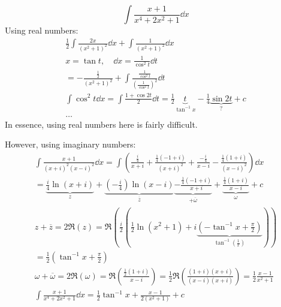 \documentclass[00_complete]{subfiles}
\begin{document}
\begin{example}
    $$\int \frac{x+1}{x^4+2x^2+1}\dd{x}$$
    Using real numbers:
    $$
    \begin{gathered}
        \frac{1}{2} \int \frac{2x}{(x^2+1)^2}\dd{x}+\int
        \frac{1}{(x^2+1)^2}\dd{x} \\
        x=\tan t, \quad \dd{x} = \frac{1}{\cos^2t}\dd{t} \\
        =-\frac{\frac{1}{2}}{(x^2+1)^2}+\int
        \frac{\frac{1}{\cos^2t}}{\left(\frac{1}{\cos^2t}\right)^2}\dd{t} \\
        \int \cos^2t\dd{x}=\int \frac{1+\cos 2t}{2}\dd{t} =
        \frac{1}{2}\underbrace{t}_{\tan^{-1}x}-\frac{1}{4}\underbrace{\sin 2t}_{?}+c\\
        \dots
    \end{gathered}
    $$
    In essence, using real numbers here is fairly difficult.

    However, using imaginary numbers:
    $$
    \begin{gathered}
        \int \frac{x+1}{(x+i)^2(x-i)^2} \dd{x}=
        \int \left(\frac{\frac{i}{4}}{x+i}+
        \frac{\frac{1}{4}(-1+i)}{(x+i)^2}+
        \frac{-\frac{i}{4}}{x-i}-
        \frac{\frac{1}{4}(1+i)}{(x-i)^2} \right)\dd{x} \\
        =\underbrace{\frac{i}{4}\ln(x+i)}_{z}+
        \underbrace{\left(-\frac{i}{4}\right)\ln(x-i)}_{\overline z}
        \underbrace{-\frac{\frac{1}{4}(-1+i)}{x+i}}_{+\overline \omega}
        +\underbrace{\frac{\frac{1}{4}(1+i)}{x-i}}_{\omega}+c \\
        z+ \overline z =
        2\Re(z)=\Re\left(\frac{i}{2}\left(\frac{1}{2}\ln(x^2+1)
        +i\underbrace{\left(-\tan^{-1}x+\frac{\pi}{2}\right)}_{\tan^{-1}\left(\frac{1}{x}\right)}\right)\right)
        \\
        =\frac{1}{2}\left(\tan^{-1}x+\frac{\pi}{2}\right) \\
        \omega + \overline \omega = 2 \Re(\omega) =
        \Re\left(\frac{\frac{1}{2}(1+i)}{x-i}\right) =
        \frac{1}{2}\Re\left(\frac{(1+i)(x+i)}{(x-i)(x+i)}\right) =
        \frac{1}{2}\frac{x-1}{x^2+1} \\
        \int \frac{x+1}{x^4+2x^2+1}\dd{x} =
        \frac{1}{2}\tan^{-1}x+\frac{x-1}{2(x^2+1)}+c
    \end{gathered}
    $$
\end{example}
\end{document}
